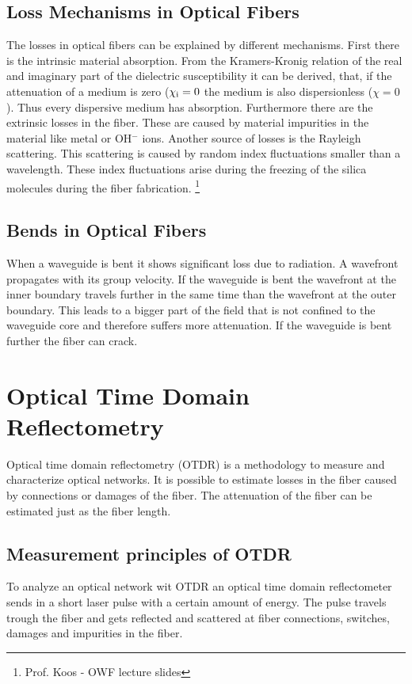 \subsection{Loss Mechanisms in Optical Fibers}
\label{loss}
The losses in optical fibers can be explained by different mechanisms. First there is the intrinsic material absorption. From the Kramers-Kronig relation of the real and imaginary part of the dielectric susceptibility it can be derived, that, if the attenuation of a medium is zero ($\chi_{\mathrm{i}}=0$ the medium is also dispersionless ($\chi=0$). Thus every dispersive medium has absorption. Furthermore there are the extrinsic losses in the fiber. These are caused by material impurities in the material like metal or OH$^-$ ions. Another source of losses is the Rayleigh scattering. This scattering is caused by random index fluctuations smaller than a wavelength. These index fluctuations arise during the freezing of the silica molecules during the fiber fabrication. \footnote[1]{Prof. Koos - OWF lecture slides}

\subsection{Bends in Optical Fibers}

When a waveguide is bent it shows significant loss due to radiation. A wavefront propagates with its group velocity. If the waveguide is bent the wavefront at the inner boundary travels further in the same time than the wavefront at the outer boundary. This leads to a bigger part of the field that is not confined to the waveguide core and therefore suffers more attenuation. If the waveguide is bent further the fiber can crack.\footnotemark[1]%


\section{Optical Time Domain Reflectometry}
Optical time domain reflectometry (OTDR) is a methodology to measure and characterize optical networks. It is possible to estimate losses in the fiber caused by connections or damages of the fiber. The attenuation of the fiber can be estimated just as the fiber length.

\subsection{Measurement principles of OTDR}
\label{subsec:Principle}
To analyze an optical network wit OTDR an optical time domain reflectometer sends in a short laser pulse with a certain amount of energy. The pulse travels trough the fiber and gets reflected and scattered at fiber connections, switches, damages and impurities in the fiber. 

